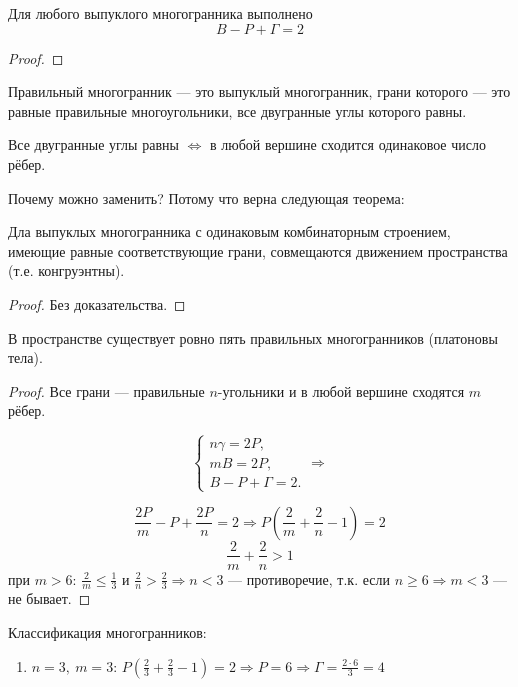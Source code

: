 \begin{theorem}
    Для любого выпуклого многогранника выполнено \[B - P + \Gamma = 2\]
\end{theorem}
\begin{proof}
    
\end{proof}

\begin{definition}
    Правильный многогранник — это выпуклый многогранник, грани которого — это равные правильные многоугольники, все двугранные углы которого равны.
\end{definition}

\begin{remark}
    Все двугранные углы равны $\Leftrightarrow$ в любой вершине сходится одинаковое число рёбер.
\end{remark}

Почему можно заменить? Потому что верна следующая теорема:

\begin{theorem}[Коши]
    Дла выпуклых многогранника с одинаковым комбинаторным строением, имеющие равные соответствующие грани, совмещаются движением пространства (т.е. конгруэнтны).
\end{theorem}
\begin{proof}
    Без доказательства.
\end{proof}

\begin{theorem}
    В пространстве существует ровно пять правильных многогранников (платоновы тела).
\end{theorem}
\begin{proof}
    Все грани — правильные $n$-угольники и в любой вершине сходятся $m$ рёбер.

    \[\begin{cases}
        n \gamma = 2 P, \\
        m B = 2 P, \\
        B - P + \Gamma = 2.
    \end{cases} \Longrightarrow\]
    
    $$\frac{2 P}{m} - P + \frac{2 P}{n} = 2 \Rightarrow P \left(\frac{2}{m} + \frac{2}{n} - 1 \right) = 2$$
    $$\frac{2}{m} + \frac{2}{n} > 1$$
    при $m > 6$: $\frac{2}{m} \leq \frac{1}{3}$ и $\frac{2}{n} > \frac{2}{3} \Rightarrow n < 3$ — противоречие, т.к. если $n \geq 6 \Rightarrow m < 3$ — не бывает.
\end{proof}

Классификация многогранников:
\begin{enumerate}
    \item $n = 3, \ m = 3$: $P \left(\frac{2}{3} + \frac{2}{3} - 1 \right) = 2 \Rightarrow P = 6 \Rightarrow \Gamma = \frac{2  \cdot 6}{3} = 4$
\end{enumerate}

